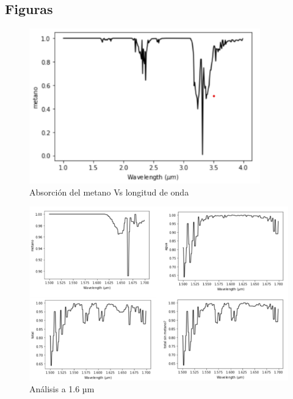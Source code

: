 \documentclass[11pt,titlepage]{article}
\begin{document}
 \subsection{Figuras}\label{subsec:figuras}
\begin{figure}[htb!]
	\centering
	\includegraphics[width=10cm]{fig/absorbmetano.png}
	\caption{Absorción del metano Vs longitud de onda}
	\label{fig:absorbMetano}
\end{figure}

\begin{figure}[htb!]
	\centering
	\includegraphics[width=15cm]{fig/analisis16.png}
	\caption{Análisis a 1.6 µm}
	\label{fig:analisis16}
\end{figure}
\end{document}
